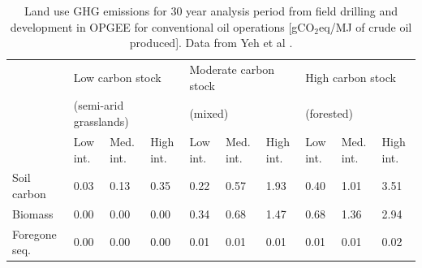 \documentclass[11pt]{report}
\begin{document}
\begin{table}
\begin{scriptsize}
\caption{Land use GHG emissions for 30 year analysis period from field drilling and development in OPGEE for conventional oil operations [gCO$_2$eq/MJ of crude oil produced]. Data from Yeh et al \cite{Yeh2010}.}
\label{tab:default_land_use_emissions_30}
\begin{tabular}{p{}p{}p{}p{}p{}p{}p{}p{}p{}p{}}
\toprule
& \multicolumn{3}{p{0.25\columnwidth}}{Low carbon stock } & \multicolumn{3}{p{0.25\columnwidth}}{Moderate carbon stock } & \multicolumn{3}{p{0.25\columnwidth}}{High carbon stock}\\
& \multicolumn{3}{p{0.25\columnwidth}}{(semi-arid grasslands)} & \multicolumn{3}{p{0.25\columnwidth}}{(mixed)} & \multicolumn{3}{p{0.25\columnwidth}}{(forested)}\\
\cmidrule{2-4} \cmidrule{5-7} \cmidrule{8-10}
& Low int. & Med. int. & High int. & Low int. & Med. int. & High int. & Low int. & Med. int. & High int.\\
\midrule
Soil carbon & 0.03 & 0.13 & 0.35 & 0.22 & 0.57 & 1.93 & 0.40 & 1.01 & 3.51\\
Biomass & 0.00 & 0.00 & 0.00 & 0.34 & 0.68 & 1.47 & 0.68 & 1.36 & 2.94\\
Foregone seq.\ & 0.00 & 0.00 & 0.00 & 0.01 & 0.01 & 0.01 & 0.01 & 0.01 & 0.02\\
\bottomrule
\end{tabular}
\end{scriptsize}
\end{table}
\end{document}
